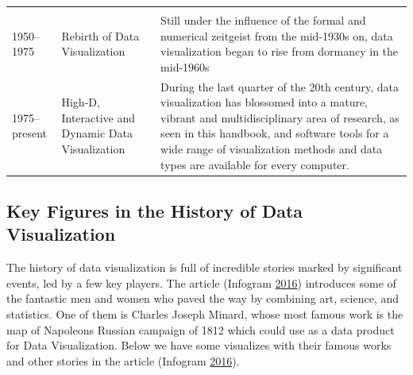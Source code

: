 \documentclass[]{book}
\begin{document}
\begin{longtable}[]{@{}lll@{}}
\begin{minipage}[t]{0.69\columnwidth}
\end{minipage}\tabularnewline
\begin{minipage}[t]{0.11\columnwidth}\raggedright
1950--1975\strut
\end{minipage} & \begin{minipage}[t]{0.11\columnwidth}\raggedright
Rebirth of Data Visualization\strut
\end{minipage} & \begin{minipage}[t]{0.69\columnwidth}\raggedright
Still under the influence of the formal and numerical zeitgeist from the mid-1930s on, data visualization began to rise from dormancy in the mid-1960s\strut
\end{minipage}\tabularnewline
\begin{minipage}[t]{0.11\columnwidth}\raggedright
1975--present\strut
\end{minipage} & \begin{minipage}[t]{0.11\columnwidth}\raggedright
High-D, Interactive and Dynamic Data Visualization\strut
\end{minipage} & \begin{minipage}[t]{0.69\columnwidth}\raggedright
During the last quarter of the 20th century, data visualization has blossomed into a mature, vibrant and multidisciplinary area of research, as seen in this handbook, and software tools for a wide range of visualization methods and data types are available for every computer.\strut
\end{minipage}\tabularnewline
\bottomrule
\end{longtable}

\hypertarget{key-figures-in-the-history-of-data-visualization}{%
\subsection{Key Figures in the History of Data Visualization}\label{key-figures-in-the-history-of-data-visualization}}

The history of data visualization is full of incredible stories marked by significant events, led by a few key players. The article (Infogram \protect\hyperlink{ref-history_viz}{2016}) introduces some of the fantastic men and women who paved the way by combining art, science, and statistics. One of them is Charles Joseph Minard, whose most famous work is the map of Napoleons Russian campaign of 1812 which could use as a data product for Data Visualization. Below we have some visualizes with their famous works and other stories in the article (Infogram \protect\hyperlink{ref-history_viz}{2016}).
\end{document}
